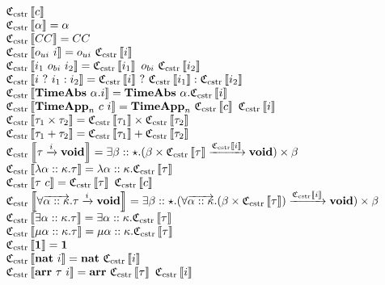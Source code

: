 \documentclass[fleqn]{article}
\begin{document}
\[
\begin{array}{l}
	\cloc{c} \\
	\cloc{\alpha} = \alpha \\
	\cloc{CC} = CC \\
	\cloc{o_{ui}~i} = o_{ui}~\cloc{i} \\
	\cloc{i_1~o_{bi}~i_2} = \cloc{i_1}~o_{bi}~\cloc{i_2} \\
	\cloc{i~?~i_1 : i_2} = \cloc{i}~?~\cloc{i_1} : \cloc{i_2} \\
	\cloc{\mathbf{TimeAbs}~\alpha.i} = \mathbf{TimeAbs}~\alpha.\cloc{i} \\
	\cloc{\mathbf{TimeApp}_n~c~i} = \mathbf{TimeApp}_n~\cloc{c}~\cloc{i} \\
	\cloc{\tau_1 \times \tau_2} = \cloc{\tau_1} \times \cloc{\tau_2} \\
	\cloc{\tau_1 + \tau_2} = \cloc{\tau_1} + \cloc{\tau_2} \\
	\cloc{\tau \xrightarrow{i} \mathbf{void}} = \exists \beta :: \star. (\beta \times \cloc{\tau} \xrightarrow{\cloc{i}} \mathbf{void}) \times \beta \\
	\cloc{\lambda \alpha :: \kappa. \tau} = \lambda \alpha :: \kappa. \cloc{\tau} \\
	\cloc{\tau~c} = \cloc{\tau}~\cloc{c} \\
	\cloc{\forall \overrightarrow{\alpha :: \kappa}. \tau \xrightarrow{i} \mathbf{void}} = \exists \beta :: \star. (\forall \overrightarrow{\alpha :: \kappa}. (\beta \times \cloc{\tau}) \xrightarrow{\cloc{i}} \mathbf{void}) \times \beta \\
	\cloc{\exists \alpha :: \kappa. \tau} = \exists \alpha :: \kappa. \cloc{\tau} \\
	\cloc{\mu \alpha :: \kappa. \tau} = \mu \alpha :: \kappa. \cloc{\tau} \\
	\cloc{\mathbf{1}} = \mathbf{1} \\
	\cloc{\mathbf{nat}~i} = \mathbf{nat}~\cloc{i} \\
	\cloc{\mathbf{arr}~\tau~i} = \mathbf{arr}~\cloc{\tau}~\cloc{i}
\end{array}
\]
\end{document}
